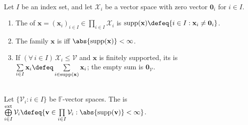 \begin{definition} \label{def:support-and-finite-family-sums} \\
Let $I$ be an index set, and let $\mathcal{X}_i$ be a vector space with zero vector $\mathbf{0}_i$ for $i\in I$.
\begin{enumerate}[label=(\roman*)]
\setlength{\itemsep}{0pt}
\item The  of $\mathbf{x}=(\mathbf{x}_i)_{i\in I}\in\prod\limits_{i\in I}\mathcal{X}_i$ is $\operatorname{supp}(\mathbf{x})\defeq\{i\in I:\mathbf{x}_i\neq\mathbf{0}_i\}$.
\item The family $\mathbf{x}$ is  iff $\abs{\operatorname{supp}(\mathbf{x})}<\infty$.
\item If $(\forall\,i\in I)\,\mathcal{X}_i\leq\mathcal{V}$ and $\mathbf{x}$ is finitely supported, its  is $\sum\limits_{i\in I}\mathbf{x}_i\defeq\sum\limits_{i\in\operatorname{supp}(\mathbf{x})}\mathbf{x}_i$; the empty sum is $\mathbf{0}_{\mathcal{V}}$.
\end{enumerate}
\end{definition}

\begin{definition} \label{def:external-products-and-direct-sums-family} \\
Let $\{\mathcal{V}_i:i\in I\}$ be $\mathbb{F}$-vector spaces. The  is $\bigoplus\limits_{i\in I}^{\mathrm{ext}}\mathcal{V}_i\defeq\{\mathbf{v}\in\prod\limits_{i\in I}\mathcal{V}_i:\abs{\operatorname{supp}(\mathbf{v})}<\infty\}$.
\end{definition}

